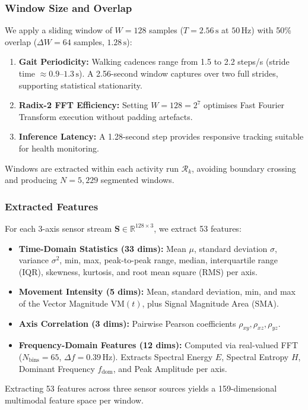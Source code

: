 \documentclass[10pt,twocolumn]{article}
\begin{document}
\subsubsection{Window Size and Overlap}
We apply a sliding window of $W = 128$ samples ($T = 2.56\,\text{s}$ at $50\,\text{Hz}$) with 50\% overlap ($\Delta W = 64$ samples, $1.28\,\text{s}$):
\begin{enumerate}
    \item \textbf{Gait Periodicity:} Walking cadences range from 1.5 to 2.2 steps/s (stride time $\approx 0.9$--$1.3\,\text{s}$). A 2.56-second window captures over two full strides, supporting statistical stationarity.
    \item \textbf{Radix-2 FFT Efficiency:} Setting $W = 128 = 2^7$ optimises Fast Fourier Transform execution without padding artefacts.
    \item \textbf{Inference Latency:} A 1.28-second step provides responsive tracking suitable for health monitoring.
\end{enumerate}
Windows are extracted within each activity run $\mathcal{R}_k$, avoiding boundary crossing and producing $N = 5,229$ segmented windows.

\subsubsection{Extracted Features}
For each 3-axis sensor stream $\mathbf{S} \in \mathbb{R}^{128 \times 3}$, we extract 53 features:
\begin{itemize}
    \item \textbf{Time-Domain Statistics (33 dims):} Mean $\mu$, standard deviation $\sigma$, variance $\sigma^2$, min, max, peak-to-peak range, median, interquartile range (IQR), skewness, kurtosis, and root mean square (RMS) per axis.
    \item \textbf{Movement Intensity (5 dims):} Mean, standard deviation, min, and max of the Vector Magnitude $\text{VM}(t)$, plus Signal Magnitude Area ($\text{SMA}$).
    \item \textbf{Axis Correlation (3 dims):} Pairwise Pearson coefficients $\rho_{xy}, \rho_{xz}, \rho_{yz}$.
    \item \textbf{Frequency-Domain Features (12 dims):} Computed via real-valued FFT ($N_{\text{bins}} = 65$, $\Delta f = 0.39\,\text{Hz}$). Extracts Spectral Energy $E$, Spectral Entropy $H$, Dominant Frequency $f_{\text{dom}}$, and Peak Amplitude per axis.
\end{itemize}
Extracting 53 features across three sensor sources yields a 159-dimensional multimodal feature space per window.
\end{document}
